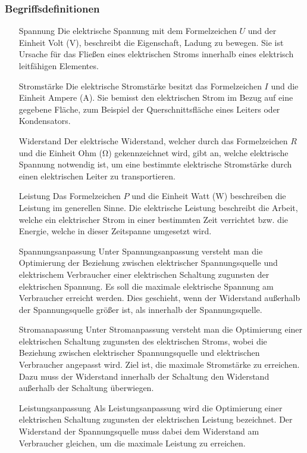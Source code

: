 \documentclass{article}
\begin{document}
    \subsubsection{Begriffsdefinitionen}
    \begin{itemize}
        \item[Spannung]
        Die elektrische Spannung mit dem Formelzeichen $U$ und der Einheit Volt ($\si{\volt}$), beschreibt die Eigenschaft, Ladung zu bewegen.
        Sie ist Ursache für das Fließen eines elektrischen Stroms innerhalb eines elektrisch leitfähigen Elementes.
        \item[Stromstärke]
        Die elektrische Stromstärke besitzt das Formelzeichen $I$ und die Einheit Ampere ($\si{\ampere}$).
        Sie bemisst den elektrischen Strom im Bezug auf eine gegebene Fläche, zum Beispiel der Querschnittsfläche eines Leiters oder Kondensators.
        \item[Widerstand]
        Der elektrische Widerstand, welcher durch das Formelzeichen $R$ und die Einheit Ohm ($\si{\ohm}$) gekennzeichnet wird, gibt an, welche elektrische Spannung notwendig ist, um eine bestimmte elektrische Stromstärke durch einen elektrischen Leiter zu transportieren.
        \item[Leistung]
        Das Formelzeichen $P$ und die Einheit Watt ($\si{\watt}$) beschreiben die Leistung im generellen Sinne.
        Die elektrische Leistung beschreibt die Arbeit, welche ein elektrischer Strom in einer bestimmten Zeit verrichtet bzw. die Energie, welche in dieser Zeitspanne umgesetzt wird.
        \item[Spannungsanpassung]
        Unter Spannungsanpassung versteht man die Optimierung der Beziehung zwischen elektrischer Spannungsquelle und elektrischem Verbraucher einer elektrischen Schaltung zugunsten der elektrischen Spannung.
        Es soll die maximale elektrische Spannung am Verbraucher erreicht werden.
        Dies geschieht, wenn der Widerstand außerhalb der Spannungsquelle größer ist, als innerhalb der Spannungsquelle.
        \item[Stromanapassung]
        Unter Stromanpassung versteht man die Optimierung einer elektrischen Schaltung zugunsten des elektrischen Stroms, wobei die Beziehung zwischen elektrischer Spannungsquelle und elektrischen Verbraucher angepasst wird.
        Ziel ist, die maximale Stromstärke zu erreichen.
        Dazu muss der Widerstand innerhalb der Schaltung den Widerstand außerhalb der Schaltung überwiegen.
        \item[Leistungsanpassung]
        Als Leistungsanpassung wird die Optimierung einer elektrischen Schaltung zugunsten der elektrischen Leistung bezeichnet.
        Der Widerstand der Spannungsquelle muss dabei dem Widerstand am Verbraucher gleichen, um die maximale Leistung zu erreichen.
    \end{itemize}
\end{document}
